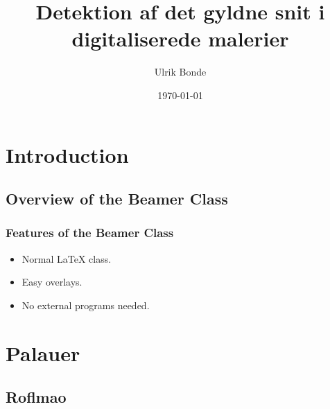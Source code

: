 \documentclass{beamer}
\title{Detektion af det gyldne snit i digitaliserede malerier}
\author{Ulrik Bonde}
\date{\today}
\begin{document}
\frame{\titlepage}

\section[Outline]{}
\frame{\tableofcontents}

\section{Introduction}
\subsection{Overview of the Beamer Class}

\frame
{
  \frametitle{Features of the Beamer Class}
  \begin{itemize}
      \item Normal LaTeX class.
      \item Easy overlays.
      \item No external programs needed.
  \end{itemize}
}

\section{Palauer}
\subsection{Roflmao}
\end{document}
